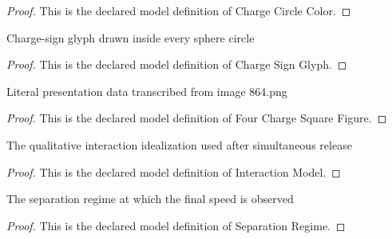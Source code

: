 \begin{proof}
  This is the declared model definition of Charge Circle Color.
\end{proof}
\begin{definition}
  \label{def:physics:phyx-mini-0864:phyxminiproblems-problemphyxmini0864-chargesignglyph}
  Charge-sign glyph drawn inside every sphere circle
\end{definition}
\begin{proof}
  This is the declared model definition of Charge Sign Glyph.
\end{proof}
\begin{definition}
  \label{def:physics:phyx-mini-0864:phyxminiproblems-problemphyxmini0864-fourchargesquarefigure}
  Literal presentation data transcribed from image 864.png
\end{definition}
\begin{proof}
  This is the declared model definition of Four Charge Square Figure.
\end{proof}
\begin{definition}
  \label{def:physics:phyx-mini-0864:phyxminiproblems-problemphyxmini0864-interactionmodel}
  The qualitative interaction idealization used after simultaneous release
\end{definition}
\begin{proof}
  This is the declared model definition of Interaction Model.
\end{proof}
\begin{definition}
  \label{def:physics:phyx-mini-0864:phyxminiproblems-problemphyxmini0864-separationregime}
  The separation regime at which the final speed is observed
\end{definition}
\begin{proof}
  This is the declared model definition of Separation Regime.
\end{proof}
